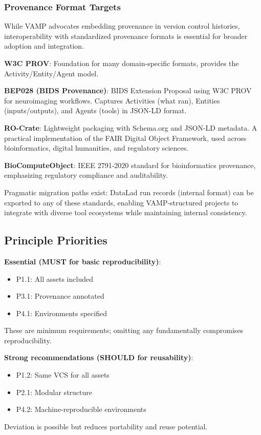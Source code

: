 \documentclass{article}
\begin{document}
\subsubsection{Provenance Format Targets}

While VAMP advocates embedding provenance in version control histories, interoperability with standardized provenance formats is essential for broader adoption and integration.

\textbf{W3C PROV}: Foundation for many domain-specific formats, provides the Activity/Entity/Agent model.

\textbf{BEP028 (BIDS Provenance)}: BIDS Extension Proposal using W3C PROV for neuroimaging workflows. Captures Activities (what ran), Entities (inputs/outputs), and Agents (tools) in JSON-LD format.

\textbf{RO-Crate}: Lightweight packaging with Schema.org and JSON-LD metadata. A practical implementation of the FAIR Digital Object Framework, used across bioinformatics, digital humanities, and regulatory sciences.

\textbf{BioComputeObject}: IEEE 2791-2020 standard for bioinformatics provenance, emphasizing regulatory compliance and auditability.

Pragmatic migration paths exist: DataLad run records (internal format) can be exported to any of these standards, enabling VAMP-structured projects to integrate with diverse tool ecosystems while maintaining internal consistency.

\subsection{Principle Priorities}

\textbf{Essential (MUST for basic reproducibility)}:
\begin{itemize}
    \item P1.1: All assets included
    \item P3.1: Provenance annotated
    \item P4.1: Environments specified
\end{itemize}
These are minimum requirements; omitting any fundamentally compromises reproducibility.

\textbf{Strong recommendations (SHOULD for reusability)}:
\begin{itemize}
    \item P1.2: Same VCS for all assets
    \item P2.1: Modular structure
    \item P4.2: Machine-reproducible environments
\end{itemize}
Deviation is possible but reduces portability and reuse potential.
\end{document}
